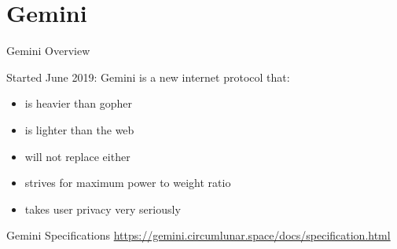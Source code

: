 \documentclass[presentation, 11pt,  aspectratio=169]{beamer}
\begin{document}
\section*{Gemini}
\label{sec:org9c5bfe2}
\begin{frame}[label={sec:org613f22c}]{Gemini Overview}
\begin{block}{Started June 2019: Gemini is a new internet protocol that:}
\begin{itemize}
\item is heavier than gopher\\
\item is lighter than the web\\
\item will not replace either\\
\item strives for maximum power to weight ratio\\
\item takes user privacy very seriously\\
\end{itemize}
\pause
\end{block}

\begin{block}{Gemini Specifications}
\url{https://gemini.circumlunar.space/docs/specification.html}\\
\end{block}
\end{frame}
\end{document}
